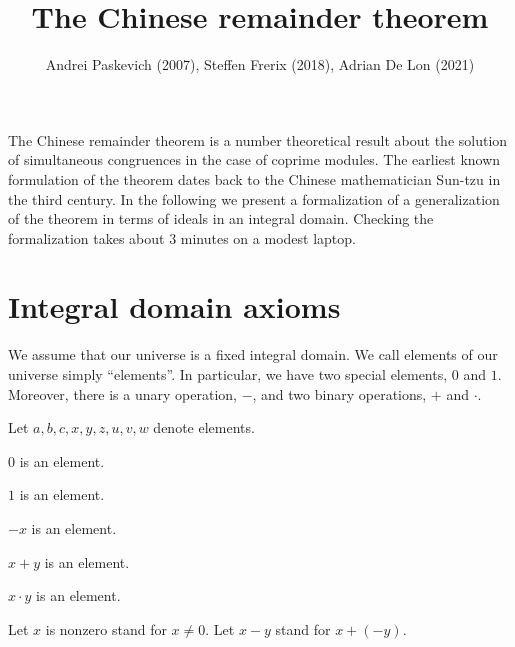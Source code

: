 \documentclass{article}
\title{The Chinese remainder theorem}
\author{Andrei Paskevich (2007), Steffen Frerix (2018), Adrian De Lon (2021)}
\date{}
\begin{document}
  \maketitle

  The Chinese remainder theorem is a number theoretical result
  about the solution of simultaneous congruences in the case of
  coprime modules. The earliest known formulation of the theorem
  dates back to the Chinese mathematician Sun-tzu in the third
  century. In the following we present a formalization of a
  generalization of the theorem in terms of ideals in an
  integral domain. Checking
  the formalization takes about 3 minutes on a modest laptop.


  \section{Integral domain axioms}

  We assume that our universe is a fixed integral domain. We call elements of
  our universe simply ``elements''. In particular, we have two special elements,
  $0$ and $1$. Moreover, there is a unary operation, $-$, and two binary
  operations, $+$ and $\cdot$.

  \begin{forthel}

    Let $a,b,c,x,y,z,u,v,w$ denote elements.

    \begin{signature}
      $0$ is an element.
    \end{signature}

    \begin{signature}
      $1$ is an element.
    \end{signature}

    \begin{signature}
      $-x$ is an element.
    \end{signature}

    \begin{signature}
      $x + y$ is an element.
    \end{signature}

    \begin{signature}
      $x \cdot y$ is an element.
    \end{signature}

    Let $x$ is nonzero stand for $x \neq 0$.
    Let $x - y$ stand for $x + (-y)$.
  \end{forthel}
\end{document}
